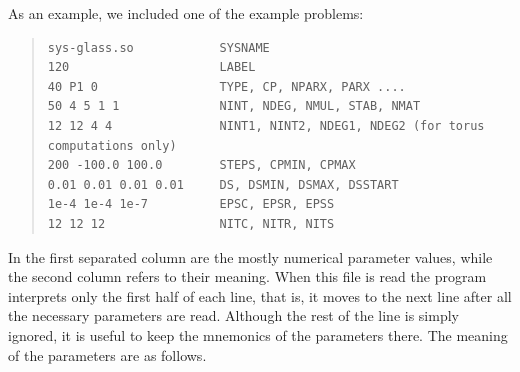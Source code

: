 \documentclass[10pt,a4paper]{ddedoc}
\begin{document}
As an example, we included one of the example problems:
{ \small \begin{quote} \begin{lstlisting}[basicstyle=\tt,frame=single]
sys-glass.so            SYSNAME
120                     LABEL
40 P1 0                 TYPE, CP, NPARX, PARX ....
50 4 5 1 1              NINT, NDEG, NMUL, STAB, NMAT
12 12 4 4               NINT1, NINT2, NDEG1, NDEG2 (for torus computations only)
200 -100.0 100.0        STEPS, CPMIN, CPMAX
0.01 0.01 0.01 0.01     DS, DSMIN, DSMAX, DSSTART
1e-4 1e-4 1e-7          EPSC, EPSR, EPSS
12 12 12                NITC, NITR, NITS
\end{lstlisting} \end{quote} } \noindent
In the first separated column are the mostly numerical parameter values, 
while the second column refers to their meaning. 
When this file is read the program interprets only the first half of each line,
that is, it moves to the next line after all the necessary parameters are read.
Although the rest of the line is simply ignored, 
it is useful to keep the mnemonics of the parameters there. The meaning of the
parameters are as follows.
\end{document}
